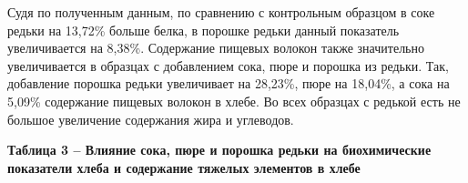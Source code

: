 Судя по полученным данным, по сравнению с контрольным образцом в соке
редьки на 13,72\% больше белка, в порошке редьки данный показатель
увеличивается на 8,38\%. Содержание пищевых волокон также значительно
увеличивается в образцах с добавлением сока, пюре и порошка из редьки.
Так, добавление порошка редьки увеличивает на 28,23\%, пюре на 18,04\%,
а сока на 5,09\% содержание пищевых волокон в хлебе. Во всех образцах с
редькой есть не большое увеличение содержания жира и углеводов.

{\bfseries Таблица 3 -- Влияние сока, пюре и порошка редьки на
биохимические показатели хлеба и содержание тяжелых элементов в хлебе}

